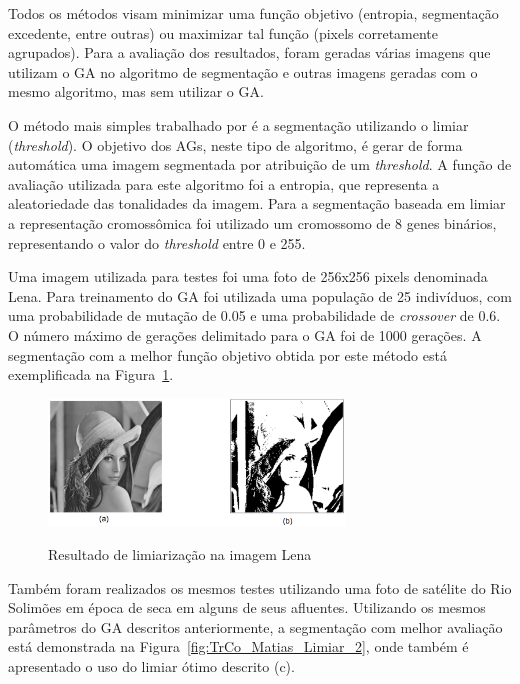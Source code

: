 \documentclass[12pt,oneside,a4paper,english,french,spanish,brazil,]{abntex2}
\begin{document}
Todos os métodos visam minimizar uma função objetivo (entropia, segmentação excedente, entre outras) ou maximizar tal função (pixels corretamente agrupados). Para a avaliação dos resultados, foram geradas várias imagens que utilizam o GA no algoritmo de segmentação e outras imagens geradas com o mesmo algoritmo, mas sem utilizar o GA. 

O método mais simples trabalhado por \citet{matias:2007} é a segmentação utilizando o limiar (\textit{threshold}). O objetivo dos AGs, neste tipo de algoritmo, é gerar de forma automática uma imagem segmentada por atribuição de um \textit{threshold}. A função de avaliação utilizada para este algoritmo foi a entropia, que representa a aleatoriedade das tonalidades da imagem. Para a segmentação baseada em limiar a representação cromossômica foi utilizado um cromossomo de 8 genes binários, representando o valor do \textit{threshold} entre 0 e 255. 

Uma imagem utilizada para testes foi uma foto de 256x256 pixels denominada Lena. Para treinamento do GA foi utilizada uma população de 25 indivíduos, com uma probabilidade de mutação de 0.05 e uma probabilidade de \textit{crossover} de 0.6. O número máximo de gerações delimitado para o GA foi de 1000 gerações. A segmentação com a melhor função objetivo obtida por este método está exemplificada na Figura~\ref{fig:TrCo_Matias_Limiar_1}.

\begin{figure}[ht]
\centering
\caption{Resultado de limiarização na imagem Lena}
\includegraphics[width=0.7\textwidth]{imagens/TrCo_Matias_Limiar_1.PNG}
\label{fig:TrCo_Matias_Limiar_1}
\end{figure}

Também foram realizados os mesmos testes utilizando uma foto de satélite do Rio Solimões em época de seca em alguns de seus afluentes. Utilizando os mesmos parâmetros do GA descritos anteriormente, a segmentação com melhor avaliação está demonstrada na Figura~\ref{fig:TrCo_Matias_Limiar_2}, onde também é apresentado o uso do limiar ótimo descrito \cite{gonzalez:2012} (c).
\end{document}
